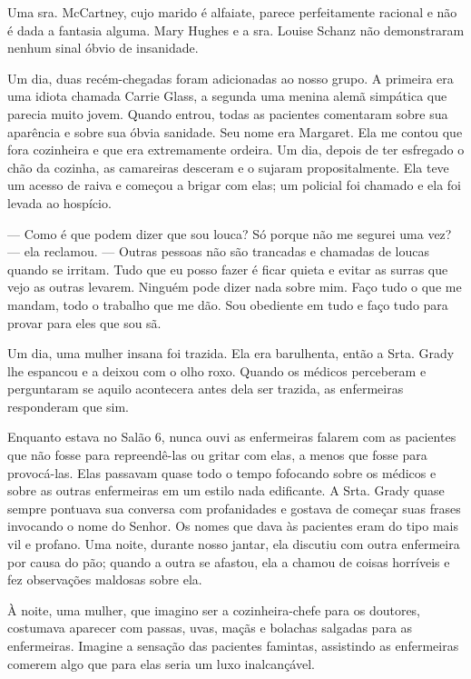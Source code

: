 Uma sra. McCartney, cujo marido é alfaiate, parece perfeitamente
racional e não é dada a fantasia alguma. Mary Hughes e a sra. Louise
Schanz não demonstraram nenhum sinal óbvio de insanidade.

Um dia, duas recém-chegadas foram adicionadas ao nosso grupo. A primeira
era uma idiota chamada Carrie Glass, a segunda uma menina alemã
simpática que parecia muito jovem. Quando entrou, todas as pacientes
comentaram sobre sua aparência e sobre sua óbvia sanidade. Seu nome era
Margaret. Ela me contou que fora cozinheira e que era extremamente
ordeira. Um dia, depois de ter esfregado o chão da cozinha, as
camareiras desceram e o sujaram propositalmente. Ela teve um acesso de
raiva e começou a brigar com elas; um policial foi chamado e ela foi
levada ao hospício.

--- Como é que podem dizer que sou louca? Só porque não me segurei uma
vez? --- ela reclamou. --- Outras pessoas não são trancadas e chamadas
de loucas quando se irritam. Tudo que eu posso fazer é ficar quieta e
evitar as surras que vejo as outras levarem. Ninguém pode dizer nada
sobre mim. Faço tudo o que me mandam, todo o trabalho que me dão. Sou
obediente em tudo e faço tudo para provar para eles que sou sã.

Um dia, uma mulher insana foi trazida. Ela era barulhenta, então a Srta.
Grady lhe espancou e a deixou com o olho roxo. Quando os médicos
perceberam e perguntaram se aquilo acontecera antes dela ser trazida, as
enfermeiras responderam que sim.

Enquanto estava no Salão 6, nunca ouvi as enfermeiras falarem com as
pacientes que não fosse para repreendê-las ou gritar com elas, a menos
que fosse para provocá-las. Elas passavam quase todo o tempo fofocando
sobre os médicos e sobre as outras enfermeiras em um estilo nada
edificante. A Srta. Grady quase sempre pontuava sua conversa com
profanidades e gostava de começar suas frases invocando o nome do
Senhor. Os nomes que dava às pacientes eram do tipo mais vil e profano.
Uma noite, durante nosso jantar, ela discutiu com outra enfermeira por
causa do pão; quando a outra se afastou, ela a chamou de coisas
horríveis e fez observações maldosas sobre ela.

À noite, uma mulher, que imagino ser a cozinheira-chefe para os
doutores, costumava aparecer com passas, uvas, maçãs e bolachas salgadas
para as enfermeiras. Imagine a sensação das pacientes famintas,
assistindo as enfermeiras comerem algo que para elas seria um luxo
inalcançável.

